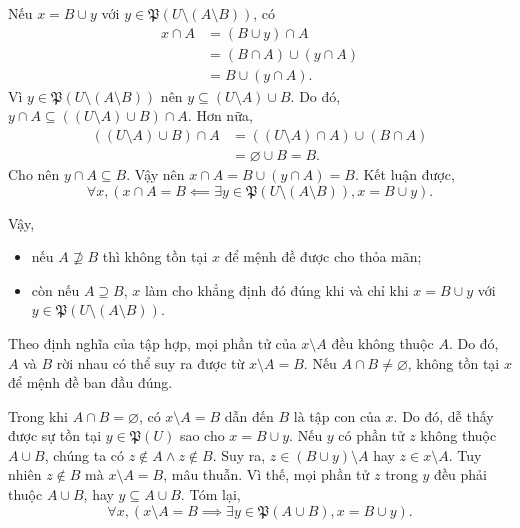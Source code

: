 Nếu $x = B \cup y$ với $y \in \mathfrak{P}(U \setminus (A \setminus B))$, có 
\begin{align*}
   x \cap A &= (B \cup y) \cap A \\
         &= (B \cap A) \cup (y \cap A) \\
         &= B \cup (y \cap A).
\end{align*}
Vì $y \in \mathfrak{P}(U \setminus (A \setminus B))$ nên $y \subseteq (U \setminus A) \cup B$. Do đó, $y \cap A \subseteq ((U \setminus A) \cup B) \cap A$. Hơn nữa,
\begin{align*}
   ((U \setminus A) \cup B) \cap A &= ((U \setminus A) \cap A) \cup (B \cap A) \\
   &= \varnothing \cup B = B.
\end{align*}
Cho nên $y \cap A \subseteq B$. Vậy nên $x \cap A = B \cup (y \cap A) = B$. Kết luận được, 
$$
   \forall x, \left(x \cap A = B \impliedby \exists y \in \mathfrak{P}(U \setminus (A \setminus B)), x = B \cup y\right).
$$

Vậy, 
\begin{itemize}
   \item nếu $A \nsupseteq B$ thì không tồn tại $x$ để mệnh đề được cho thỏa mãn;
   \item còn nếu $A \supseteq B$, $x$ làm cho khẳng định đó đúng khi và chỉ khi $x = B \cup y$ với $y \in \mathfrak{P}(U \setminus (A \setminus B))$.
\end{itemize}

\stepSubexercise Theo định nghĩa của tập hợp, mọi phần tử của $x \setminus A$ đều không thuộc $A$. Do đó, $A$ và $B$ rời nhau có thể suy ra được từ $x \setminus A = B$. Nếu $A \cap B \neq \varnothing$, không tồn tại $x$ để mệnh đề ban đầu đúng.

Trong khi $A \cap B = \varnothing$, có $x \setminus A = B$ dẫn đến $B$ là tập con của $x$. Do đó, dễ thấy được sự tồn tại $y \in \mathfrak{P}(U)$ sao cho $x = B \cup y$. Nếu $y$ có phần tử $z$ không thuộc $A \cup B$, chúng ta có $z \notin A \land z \notin B$. Suy ra, $z \in (B \cup y) \setminus A$ hay $z \in x \setminus A$. Tuy nhiên $z \notin B$ mà $x \setminus A = B$, mâu thuẫn. Vì thế, mọi phần tử $z$ trong $y$ đều phải thuộc $A \cup B$, hay $y \subseteq A \cup B$. Tóm lại, 
$$
   \forall x, \left(x \setminus A = B \implies \exists y \in \mathfrak{P}(A \cup B), x = B \cup y\right).
$$

